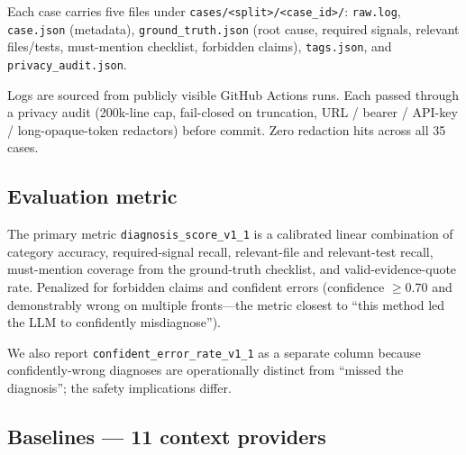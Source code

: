 \documentclass{article}
\begin{document}
Each case carries five files under
\texttt{cases/<split>/<case\_id>/}: \texttt{raw.log},
\texttt{case.json} (metadata), \texttt{ground\_truth.json} (root
cause, required signals, relevant files/tests, must-mention
checklist, forbidden claims), \texttt{tags.json}, and
\texttt{privacy\_audit.json}.

Logs are sourced from publicly visible GitHub Actions runs. Each
passed through a privacy audit (200k-line cap, fail-closed on
truncation, URL / bearer / API-key / long-opaque-token redactors)
before commit. Zero redaction hits across all 35 cases.

\subsection{Evaluation metric}

The primary metric \texttt{diagnosis\_score\_v1\_1} is a calibrated
linear combination of category accuracy, required-signal recall,
relevant-file and relevant-test recall, must-mention coverage from
the ground-truth checklist, and valid-evidence-quote rate.
Penalized for forbidden claims and confident errors (confidence
$\geq 0.70$ and demonstrably wrong on multiple fronts---the metric
closest to ``this method led the LLM to confidently misdiagnose'').

We also report \texttt{confident\_error\_rate\_v1\_1} as a separate
column because confidently-wrong diagnoses are operationally
distinct from ``missed the diagnosis''; the safety implications
differ.

\subsection{Baselines --- 11 context providers}
\label{sec:baselines}
\end{document}
